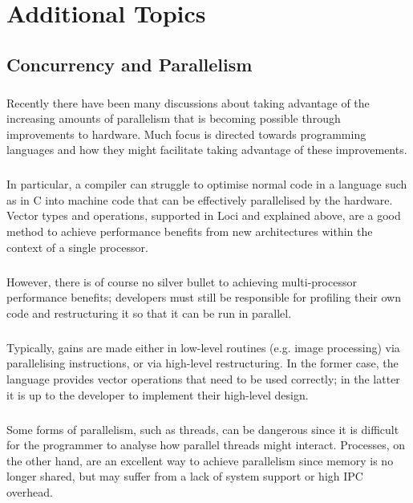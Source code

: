 \documentclass[12pt,twoside,notitlepage]{report}
\begin{document}
\cleardoublepage

\chapter{Additional Topics}

\section{Concurrency and Parallelism}

\paragraph{}
Recently there have been many discussions about taking advantage of the increasing amounts of parallelism that is becoming possible through improvements to hardware. Much focus is directed towards programming languages and how they might facilitate taking advantage of these improvements.

\paragraph{}
In particular, a compiler can struggle to optimise normal code in a language such as in C into machine code that can be effectively parallelised by the hardware. Vector types and operations, supported in Loci and explained above, are a good method to achieve performance benefits from new architectures within the context of a single processor.

\paragraph{}
However, there is of course no silver bullet to achieving multi-processor performance benefits; developers must still be responsible for profiling their own code and restructuring it so that it can be run in parallel.

\paragraph{}
Typically, gains are made either in low-level routines (e.g. image processing) via parallelising instructions, or via high-level restructuring. In the former case, the language provides vector operations that need to be used correctly; in the latter it is up to the developer to implement their high-level design.

\paragraph{}
Some forms of parallelism, such as threads, can be dangerous since it is difficult for the programmer to analyse how parallel threads might interact. Processes, on the other hand, are an excellent way to achieve parallelism since memory is no longer shared, but may suffer from a lack of system support or high IPC overhead.
\end{document}
